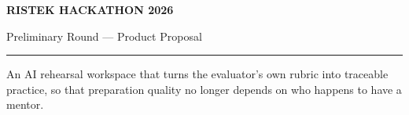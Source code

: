 \thispagestyle{ristekcover}

\begin{center}

\vspace*{0.15cm}

{\fontsize{12}{15}\selectfont\bfseries\color{inkgrey}
RISTEK HACKATHON 2026\par}

\vspace{2pt}

{\fontsize{11}{14}\selectfont\color{inkgrey}
Preliminary Round --- Product Proposal\par}

\vspace{6pt}
{\color{rulegrey}\rule{4cm}{0.6pt}}
\vspace{16pt}


\vspace{14pt}

\begin{minipage}{0.88\textwidth}
  \centering
  {\fontsize{12}{17}\selectfont\color{inkgrey}
  An AI rehearsal workspace that turns the evaluator's own rubric into
  traceable practice, so that preparation quality no longer depends on
  who happens to have a mentor.\par}
\end{minipage}


\end{center}
